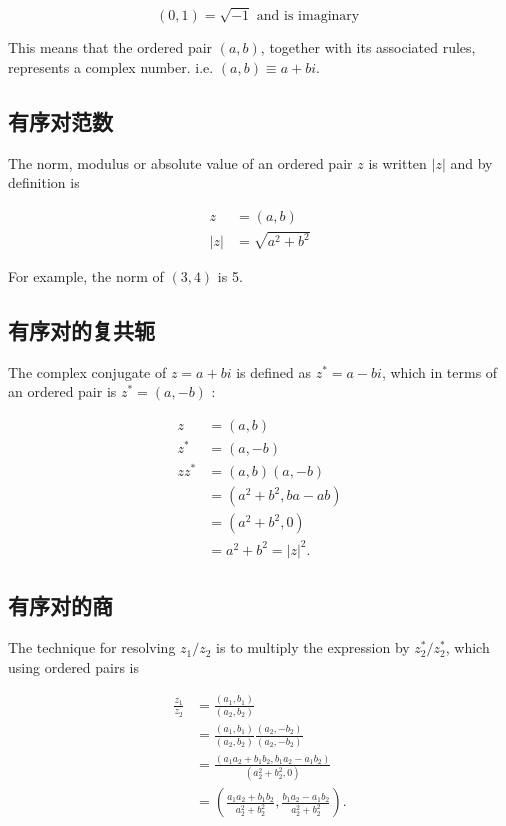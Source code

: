 $$
(0,1)=\sqrt{-1} \text { and is imaginary }
$$

This means that the ordered pair $(a, b)$, together with its associated rules, represents a complex number. i.e. $(a, b) \equiv a+b i$.

\subsection{有序对范数}
The norm, modulus or absolute value of an ordered pair $z$ is written $|z|$ and by definition is

$$
\begin{aligned}
z & =(a, b) \\
|z| & =\sqrt{a^{2}+b^{2}}
\end{aligned}
$$

For example, the norm of $(3,4)$ is 5.

\subsection{有序对的复共轭}
The complex conjugate of $z=a+b i$ is defined as $z^{*}=a-b i$, which in terms of an ordered pair is $z^{*}=(a,-b)$ :

$$
\begin{aligned}
z & =(a, b) \\
z^{*} & =(a,-b) \\
z z^{*} & =(a, b)(a,-b) \\
& =\left(a^{2}+b^{2}, b a-a b\right) \\
& =\left(a^{2}+b^{2}, 0\right) \\
& =a^{2}+b^{2}=|z|^{2} .
\end{aligned}
$$

\subsection{有序对的商}
The technique for resolving $z_{1} / z_{2}$ is to multiply the expression by $z_{2}^{*} / z_{2}^{*}$, which using ordered pairs is

$$
\begin{aligned}
\frac{z_{1}}{z_{2}} & =\frac{\left(a_{1}, b_{1}\right)}{\left(a_{2}, b_{2}\right)} \\
& =\frac{\left(a_{1}, b_{1}\right)}{\left(a_{2}, b_{2}\right)} \frac{\left(a_{2},-b_{2}\right)}{\left(a_{2},-b_{2}\right)} \\
& =\frac{\left(a_{1} a_{2}+b_{1} b_{2}, b_{1} a_{2}-a_{1} b_{2}\right)}{\left(a_{2}^{2}+b_{2}^{2}, 0\right)} \\
& =\left(\frac{a_{1} a_{2}+b_{1} b_{2}}{a_{2}^{2}+b_{2}^{2}}, \frac{b_{1} a_{2}-a_{1} b_{2}}{a_{2}^{2}+b_{2}^{2}}\right) .
\end{aligned}
$$

